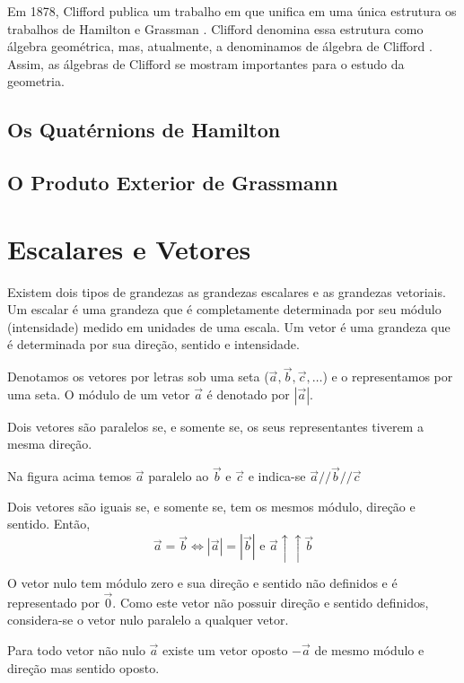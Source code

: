 \documentclass[12pt, oneside, a4paper, english, brazil]{abntex2}
\providecommand{\abs}[1]{\left\vert #1 \right\vert}
\renewcommand{\vec}{\overrightarrow}
\theoremstyle{normal}
\theoremstyle{observacao}
\begin{document}
Em 1878, Clifford publica um trabalho em que unifica em uma única estrutura os trabalhos de Hamilton e Grassman \cite{sousa2013}. Clifford denomina essa estrutura como álgebra geométrica, mas, atualmente, a denominamos de álgebra de Clifford \cite{vazjr2000}. Assim, as álgebras de Clifford se mostram importantes para o estudo da geometria.  \cite{batistasantos2012}

\section{Os Quatérnions de Hamilton}

\section{O Produto Exterior de Grassmann}

\chapter{Escalares e Vetores}\label{revisao}

Existem dois tipos de grandezas as grandezas escalares e as grandezas vetoriais. Um escalar é uma grandeza que é completamente determinada por seu módulo (intensidade) medido em unidades de uma escala. Um vetor é uma grandeza que é determinada por sua direção, sentido e intensidade. 

Denotamos os vetores por letras sob uma seta ($\vec{a}, \vec{b}, \vec{c}, \ldots$) e o representamos por uma seta. O módulo de um vetor $\vec{a}$ é denotado por $\abs{\vec{a}}$. 

Dois vetores são paralelos se, e somente se, os seus representantes tiverem a mesma direção. 

Na figura acima temos $\vec{a}$ paralelo ao $\vec{b}$ e $\vec{c}$ e indica-se $\vec{a} // \vec{b} // \vec{c}$

Dois vetores são iguais se, e somente se, tem os mesmos módulo, direção e sentido. Então,
\[
\vec{a}=\vec{b} \Longleftrightarrow \abs{\vec{a}}=\abs{\vec{b}} \textrm{ e } \vec{a} \uparrow\uparrow \vec{b}
\]

O vetor nulo tem módulo zero e sua direção e sentido não definidos e é representado por $\vec{0}$. Como este vetor não possuir direção e sentido definidos, considera-se o vetor nulo paralelo a qualquer vetor. 

Para todo vetor não nulo $\vec{a}$ existe um vetor oposto $-\vec{a}$ de mesmo módulo e direção mas sentido oposto.
\end{document}
